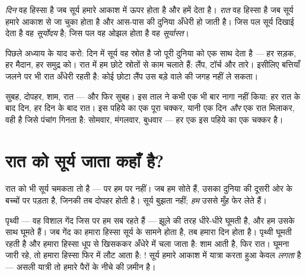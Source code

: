 \begin{definition}[दिन और रात]\label{def:g1:day-and-night:daynight}
\emph{दिन} वह हिस्सा है जब सूर्य हमारे आकाश में ऊपर होता
है और हमें  देता है। \emph{रात} वह हिस्सा है जब सूर्य
हमारे आकाश से जा चुका होता है और आस-पास की दुनिया अँधेरी हो जाती है।
जिस पल सूर्य दिखाई देता है वह \emph{सूर्योदय} है; जिस
पल वह ओझल होता है वह \emph{सूर्यास्त}।
\end{definition}

\begin{remark}[दिन का महादीप]\label{rem:g1:day-and-night:lamp}
पिछले अध्याय के  याद करो: दिन में सूर्य वह स्रोत है जो
पूरी दुनिया को एक साथ  देता है --- हर सड़क, हर मैदान, हर समुद्र
को। रात में हम छोटे स्रोतों से काम चलाते हैं: लैंप, टॉर्च और तारे।
इसीलिए बत्तियाँ जलने पर भी रात अँधेरी रहती है: कोई छोटा लैंप उस बड़े
वाले की जगह नहीं ले सकता।
\end{remark}

\begin{example}[ताल दोहराती है]\label{ex:g1:day-and-night:rhythm}
सुबह, दोपहर, शाम, रात --- और फिर सुबह। इस ताल ने कभी एक भी बार नागा
नहीं किया: हर रात के बाद दिन, हर दिन के बाद रात। इस पहिये का एक पूरा
चक्कर, यानी एक दिन \emph{और} एक रात मिलाकर, वही है जिसे पंचांग गिनता
है: सोमवार, मंगलवार, बुधवार --- हर एक इस पहिये का एक चक्कर है।
\end{example}

\section{रात को सूर्य जाता कहाँ है?}

रात को भी सूर्य चमकता तो है --- पर हम पर नहीं। जब हम सोते हैं, उसका
 दुनिया की दूसरी ओर के बच्चों पर पड़ता है, जिनकी तब दोपहर होती
है। सूर्य बुझता नहीं; \emph{हम} उससे मुँह फेर लेते हैं।

\begin{example}[घूमती हुई पृथ्वी]\label{ex:g1:day-and-night:spinning}
पृथ्वी --- वह विशाल गेंद जिस पर हम सब रहते हैं --- झूले की तरह धीरे-धीरे
घूमती है, और हम उसके साथ घूमते हैं। जब गेंद का हमारा हिस्सा सूर्य के
सामने होता है, तब हमारा दिन होता है। पृथ्वी घूमती रहती है और हमारा
हिस्सा धूप से खिसककर अँधेरे में चला जाता है: शाम आती है, फिर रात।
घूमना जारी रहे, तो हमारा हिस्सा फिर  में लौट आता है: !
सूर्य हमारे आकाश में यात्रा करता हुआ केवल \emph{लगता} है --- असली
यात्री तो हमारे पैरों के नीचे की ज़मीन है।
\end{example}

